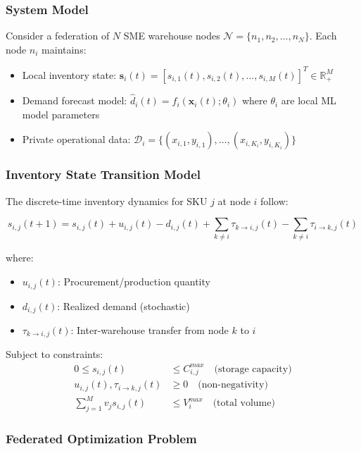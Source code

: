\documentclass[times,10pt,twocolumn]{jucs2e}
\begin{document}
\subsubsection{System Model}

Consider a federation of $N$ SME warehouse nodes $\mathcal{N} = \{n_1, n_2, \ldots, n_N\}$. Each node $n_i$ maintains:
\begin{itemize}
\item Local inventory state: $\mathbf{s}_i(t) = [s_{i,1}(t), s_{i,2}(t), \ldots, s_{i,M}(t)]^T \in \mathbb{R}^M_+$
\item Demand forecast model: $\hat{d}_i(t) = f_i(\mathbf{x}_i(t); \theta_i)$ where $\theta_i$ are local ML model parameters
\item Private operational data: $\mathcal{D}_i = \{(x_{i,1}, y_{i,1}), \ldots, (x_{i,K_i}, y_{i,K_i})\}$
\end{itemize}

\subsubsection{Inventory State Transition Model}

The discrete-time inventory dynamics for SKU $j$ at node $i$ follow:

\begin{equation}
s_{i,j}(t+1) = s_{i,j}(t) + u_{i,j}(t) - d_{i,j}(t) + \sum_{k \neq i} \tau_{k \to i,j}(t) - \sum_{k \neq i} \tau_{i \to k,j}(t)
\end{equation}

where:
\begin{itemize}
\item $u_{i,j}(t)$: Procurement/production quantity
\item $d_{i,j}(t)$: Realized demand (stochastic)
\item $\tau_{k \to i,j}(t)$: Inter-warehouse transfer from node $k$ to $i$
\end{itemize}

Subject to constraints:
\begin{align}
0 \leq s_{i,j}(t) &\leq C_{i,j}^{max} \quad \text{(storage capacity)} \\
u_{i,j}(t), \tau_{i \to k,j}(t) &\geq 0 \quad \text{(non-negativity)} \\
\sum_{j=1}^M v_j s_{i,j}(t) &\leq V_i^{max} \quad \text{(total volume)}
\end{align}

\subsubsection{Federated Optimization Problem}
\end{document}
